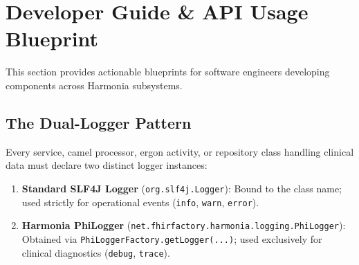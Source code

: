 \section{Developer Guide \& API Usage Blueprint}
\label{sec:phi_developer_guide}

This section provides actionable blueprints for software engineers developing components across Harmonia subsystems.

\subsection{The Dual-Logger Pattern}

Every service, camel processor, ergon activity, or repository class handling clinical data must declare two distinct logger instances:
\begin{enumerate}
    \item \textbf{Standard SLF4J Logger} (\texttt{org.slf4j.Logger}): Bound to the class name; used strictly for operational events (\texttt{info}, \texttt{warn}, \texttt{error}).
    \item \textbf{Harmonia PhiLogger} (\texttt{net.fhirfactory.harmonia.logging.PhiLogger}): Obtained via \texttt{PhiLoggerFactory.getLogger(...)}; used exclusively for clinical diagnostics (\texttt{debug}, \texttt{trace}).
\end{enumerate}

